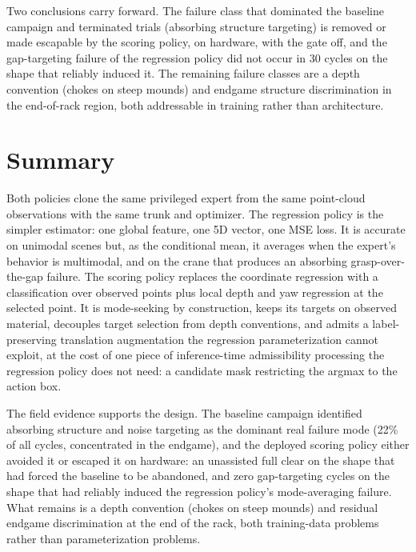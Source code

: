 Two conclusions carry forward. The failure class that dominated the baseline
campaign and terminated trials (absorbing structure targeting) is removed or
made escapable by the scoring policy, on hardware, with the gate off, and the
gap-targeting failure of the regression policy did not occur in 30 cycles on
the shape that reliably induced it. The remaining failure classes are a depth
convention (chokes on steep mounds) and endgame structure discrimination in
the end-of-rack region, both addressable in training rather than architecture.

\section{Summary}

Both policies clone the same privileged expert from the same point-cloud
observations with the same trunk and optimizer. The regression policy is the
simpler estimator: one global feature, one 5D vector, one MSE loss. It is
accurate on unimodal scenes but, as the conditional mean, it averages when
the expert's behavior is multimodal, and on the crane that produces an
absorbing grasp-over-the-gap failure. The scoring policy replaces the
coordinate regression with a classification over observed points plus local
depth and yaw regression at the selected point. It is mode-seeking by
construction, keeps its targets on observed material, decouples target
selection from depth conventions, and admits a label-preserving translation
augmentation the regression parameterization cannot exploit, at the cost of
one piece of inference-time admissibility processing the regression policy
does not need: a candidate mask restricting the argmax to the action box.

The field evidence supports the design. The baseline campaign identified
absorbing structure and noise targeting as the dominant real failure mode
(22\% of all cycles, concentrated in the endgame), and the deployed scoring
policy either avoided it or escaped it on hardware: an unassisted full clear
on the shape that had forced the baseline to be abandoned, and zero
gap-targeting cycles on the shape that had reliably induced the regression
policy's mode-averaging failure. What remains is a depth convention (chokes
on steep mounds) and residual endgame discrimination at the end of the rack,
both training-data problems rather than parameterization problems.
